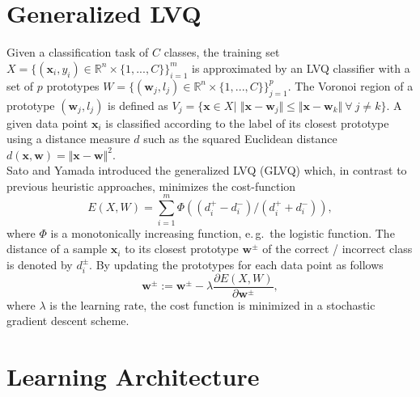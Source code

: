 \documentclass[conference]{IEEEtran}
\begin{document}
\section{Generalized LVQ}\label{relatedWork}
\newcommand{\x}{\mathbf{x}}
\newcommand{\w}{\mathbf{w}}
Given a classification task of $C$ classes, the training set $X= \{ (\mathbf{x}_i,y_i) \in \mathbb{R}^n \times \{1,...,C\}\}_{i=1}^m$ is approximated
by an LVQ classifier with a set of $p$ prototypes $W= \{(\mathbf{w}_j,l_j) \in \mathbb{R}^n \times \{1,...,C\}\}_{j=1}^p$.
The Voronoi region of a prototype $(\w_j,l_j)$ is defined as 
$V_j=\{\mathbf{x} \in X|$ $\Vert \mathbf{x}-\mathbf{w}_j\Vert \leq \Vert \mathbf{x}-\mathbf{w}_k\Vert \ \forall \ j \neq k\}$.
A given data point $\x_i$ is classified according to the label of its closest prototype using a distance measure $d$ such as the squared Euclidean distance $d(\x,\w) = \Vert\x-\w\Vert^2$.\\
Sato and Yamada introduced the generalized LVQ (GLVQ) \cite{conf/nips/SatoY95} which, in contrast to previous heuristic approaches, minimizes the cost-function
\begin{equation}\label{eq:costFunction}
E(X,W)=\sum_{i=1}^{m} \Phi((d^+_i-d^-_i)/(d^+_i+d^-_i)),
\end{equation}
where $\Phi$ is a monotonically increasing function, e.\,g.\ the logistic function. The distance of a sample $\x_i$ to its closest prototype $\w^\pm$ of the correct / incorrect class is
denoted by $d^{\pm}_i$.
By updating the prototypes for each data point as follows
\begin{equation}\label{eq:glvqUpdate}
\w^\pm := \w^\pm-\lambda \frac{\partial E(X,W)}{\partial \w^\pm},
\end{equation} 
where $\lambda$ is the learning rate, the cost function is minimized in a stochastic gradient descent scheme.

\section{Learning Architecture}\label{IncrementaLearningMethod}

\end{document}
